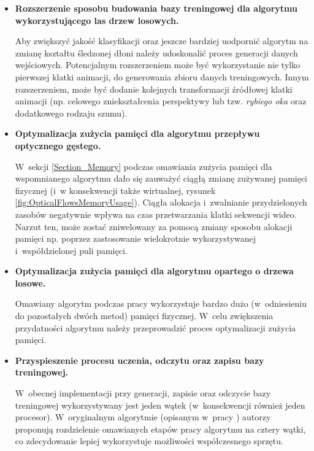     \begin{itemize}
      \item \textbf{Rozszerzenie sposobu budowania bazy treningowej dla algorytmu wykorzystującego las drzew losowych.}

      Aby zwiększyć jakość klasyfikacji oraz jeszcze bardziej uodpornić algorytm na zmianę kształtu śledzonej dłoni należy udoskonalić proces generacji danych wejściowych. Potencjalnym rozszerzeniem może być wykorzystanie nie tylko pierwszej klatki animacji, do generowania zbioru danych treningowych. Innym rozszerzeniem, może być dodanie kolejnych transformacji źródłowej klatki animacji (np. celowego zniekształcenia perspektywy lub tzw. \textit{rybiego oka} oraz dodatkowego rodzaju szumu).

      \item \textbf{Optymalizacja zużycia pamięci dla algorytmu przepływu optycznego gęstego.}

      W~sekcji \ref{Section_Memory} podczas omawiania zużycia pamięci dla wspomnianego algorytmu dało się zauważyć ciągłą zmianę zużywanej pamięci fizycznej (i~w konsekwencji także wirtualnej, rysunek \ref{fig:OpticalFlowsMemoryUsage}). Ciągła alokacja i~zwalnianie przydzielonych zasobów negatywnie wpływa na czas przetwarzania klatki sekwencji wideo. Narzut ten, może zostać zniwelowany za pomocą zmiany sposobu alokacji pamięci np. poprzez zastosowanie wielokrotnie wykorzystywanej i~współdzielonej puli pamięci.

      \item \textbf{Optymalizacja zużycia pamięci dla algorytmu opartego o drzewa losowe.}

      Omawiany algorytm podczas pracy wykorzystuje bardzo dużo (w~odniesieniu do pozostałych dwóch metod) pamięci fizycznej. W~celu zwiększenia przydatności algorytmu należy przeprowadzić proces optymalizacji zużycia pamięci.

      \item \textbf{Przyspieszenie procesu uczenia, odczytu oraz zapisu bazy treningowej.}

       W~obecnej implementacji przy generacji, zapisie oraz odczycie bazy treningowej wykorzystywany jest jeden wątek (w~konsekwencji również jeden procesor). W~oryginalnym algorytmie (opisanym w~pracy \cite{RandomizedTrees06}) autorzy proponują rozdzielenie omawianych etapów pracy algorytmu na cztery wątki, co zdecydowanie lepiej wykorzystuje możliwości współczesnego sprzętu.
    \end{itemize}


